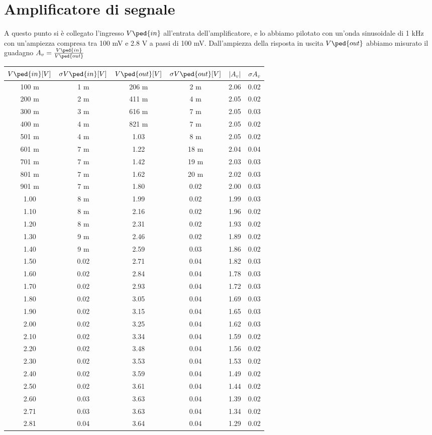 \documentclass[10pt, a4paper, italian]{article}
\begin{document}
\section{Amplificatore di segnale}
A questo punto si è collegato l'ingresso $V\ped{in}$ all'entrata dell'amplificatore, e lo abbiamo pilotato con un'onda sinusoidale di 1 kHz con un'ampiezza compresa tra 100 mV e 2.8 V a passi di 100 mV. Dall'ampiezza della risposta in uscita $V\ped{out}$ abbiamo misurato il guadagno $A_v = \frac{V\ped{in}}{V\ped{out}}$
\begin{table}[htbp]
\centering
\begin{tabular}{cccccc}
\toprule
$V\ped{in} [V]$ & $\sigma V\ped{in}[V]$ & $V\ped{out} [V]$ & $\sigma V\ped{out} [V]$ & $|A_v|$ & $\sigma A_v$ \\
\midrule
\midrule
100 m & 1 m  & 206 m & 2 m   & 2.06 & 0.02 \\
200 m & 2 m  & 411 m & 4 m   & 2.05 & 0.02 \\
300 m & 3 m  & 616 m & 7 m  & 2.05 & 0.03 \\
400 m & 4 m  & 821 m & 7 m  & 2.05 & 0.02 \\
501 m & 4 m  & 1.03  & 8 m  & 2.05 & 0.02 \\
601 m & 7 m  & 1.22  & 18 m & 2.04 & 0.04 \\
701 m & 7 m  & 1.42  & 19 m & 2.03 & 0.03 \\
801 m & 7 m  & 1.62  & 20 m & 2.02 & 0.03 \\
901 m & 7 m  & 1.80  & 0.02 & 2.00 & 0.03 \\
1.00  & 8 m  & 1.99  & 0.02 & 1.99 & 0.03 \\
1.10  & 8 m  & 2.16  & 0.02 & 1.96 & 0.02 \\
1.20  & 8 m  & 2.31  & 0.02 & 1.93 & 0.02 \\
1.30  & 9 m  & 2.46  & 0.02 & 1.89 & 0.02 \\
1.40  & 9 m  & 2.59  & 0.03 & 1.86 & 0.02 \\
1.50  & 0.02 & 2.71  & 0.04 & 1.82 & 0.03 \\
1.60  & 0.02 & 2.84  & 0.04 & 1.78 & 0.03 \\
1.70  & 0.02 & 2.93  & 0.04 & 1.72 & 0.03 \\
1.80  & 0.02 & 3.05  & 0.04 & 1.69 & 0.03 \\
1.90  & 0.02 & 3.15  & 0.04 & 1.65 & 0.03 \\
2.00  & 0.02 & 3.25  & 0.04 & 1.62 & 0.03 \\
2.10  & 0.02 & 3.34  & 0.04 & 1.59 & 0.02 \\
2.20  & 0.02 & 3.48  & 0.04 & 1.56 & 0.02 \\
2.30  & 0.02 & 3.53  & 0.04 & 1.53 & 0.02 \\
2.40  & 0.02 & 3.59  & 0.04 & 1.49 & 0.02 \\
2.50  & 0.02 & 3.61  & 0.04 & 1.44 & 0.02 \\
2.60  & 0.03 & 3.63  & 0.04 & 1.39 & 0.02 \\
2.71  & 0.03 & 3.63  & 0.04 & 1.34 & 0.02 \\
2.81  & 0.04 & 3.64  & 0.04 & 1.29 & 0.02 \\
\bottomrule
\end{tabular}
\end{table}
\end{document}
